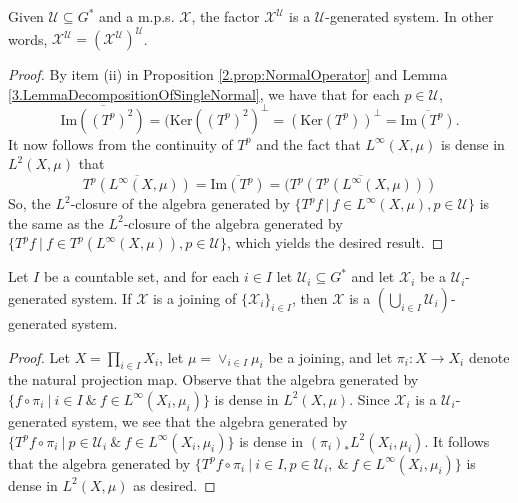 \documentclass[graybox]{svmult}
\theoremstyle{definition}
\begin{document}
\begin{lemma}\label{lem:StabilityOfParreauFactors}
    Given $\mathcal{U} \subseteq G^*$ and a m.p.s. $\mathcal{X}$, the factor $\mathcal{X}^{\mathcal{U}}$ is a $\mathcal{U}$-generated system. In other words, $\mathcal X^{\mathcal U}=(\mathcal X^{\mathcal U})^\mathcal U$.
\end{lemma}

\begin{proof}
By item (ii) in Proposition \ref{2.prop:NormalOperator} and Lemma \ref{3.LemmaDecompositionOfSingleNormal}, we have that for each $p\in \mathcal U$,
$$
\overline{\text{Im}((T^p)^2)}=(\text{Ker}((T^p)^2)^\perp=(\text{Ker}(T^p))^\perp=\overline{\text{Im}(T^p)}.
$$
It now follows from the continuity of $T^p$ and the fact that $L^\infty(X,\mu)$ is dense in $L^2(X,\mu)$ that 
$$\overline{T^p(L^\infty(X,\mu))}=\overline{\text{Im}(T^p)}=\overline{(T^p(T^p(L^\infty(X,\mu)))}$$
So,  the $L^2$-closure of the algebra generated by $\{T^pf\ |\ f \in L^\infty(X,\mu), p \in \mathcal{U}\}$ is the same as the $L^2$-closure of the algebra generated by $\{T^pf\ |\ f \in T^p(L^\infty(X,\mu)), p \in \mathcal{U}\}$, which yields the desired result.
\end{proof}

\begin{lemma}\label{lem:ParreauFactorsAreClosedUnderJoinings}
    Let $I$ be a countable set, and for each $i \in I$ let $\mathcal{U}_i \subseteq G^*$ and let $\mathcal{X}_i$ be a $\mathcal{U}_i$-generated system.
    If $\mathcal{X}$ is a joining of $\{\mathcal{X}_i\}_{i \in I}$, then $\mathcal{X}$ is a $\left(\bigcup_{i \in I}\mathcal{U}_i\right)$-generated system.
\end{lemma}

\begin{proof}
    Let $X = \prod_{i \in I}X_i$, let $\mu = \vee_{i \in I}\mu_i$ be a joining, and let $\pi_i:X\rightarrow X_i$ denote the natural projection map.
    Observe that the algebra generated by $\{f\circ\pi_i\ |\ i \in I\ \&\ f \in L^\infty(X_i,\mu_i)\}$ is dense in $L^2(X,\mu)$.
    Since $\mathcal{X}_i$ is a $\mathcal{U}_i$-generated system, we see that the algebra generated by $\{T^pf\circ\pi_i\ |\ p \in \mathcal{U}_i\ \&\ f \in L^\infty(X_i,\mu_i)\}$ is dense in $(\pi_i)_*L^2(X_i,\mu_i)$.
    It follows that the algebra generated by $\{T^pf\circ\pi_i\ |\ i \in I, p \in \mathcal{U}_i,\ \&\ f \in L^\infty(X_i,\mu_i)\}$ is dense in $L^2(X,\mu)$ as desired.
\end{proof}
\end{document}
